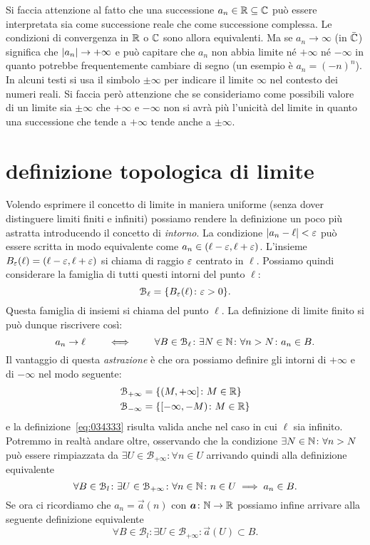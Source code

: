 Si faccia attenzione al fatto che una successione $a_n\in \mathbb R \subseteq \mathbb C$
può essere interpretata sia come successione reale che come successione complessa.
Le condizioni di convergenza in $\mathbb R$ o $\mathbb C$ sono allora equivalenti. Ma
se $a_n \to \infty$ (in $\bar {\mathbb C}$) significa che ${\left|a_n\right|}\to +\infty$
e può capitare che $a_n$ non abbia limite né $+\infty$
né $-\infty$ in quanto potrebbe frequentemente cambiare di segno
(un esempio è $a_n = (-n)^n$).
In alcuni testi si usa il simbolo $\pm \infty$ per indicare
il limite $\infty$ nel contesto dei numeri reali. Si faccia però
attenzione che se consideriamo come possibili valore di un limite
sia $\pm\infty$ che $+\infty$ e $-\infty$ non si avrà più l'unicità
del limite in quanto una successione che tende a $+\infty$
tende anche a $\pm \infty$.

\section{definizione topologica di limite}

Volendo esprimere il concetto di limite in maniera uniforme
(senza dover distinguere limiti finiti e infiniti) possiamo
rendere la definizione un poco più astratta introducendo il concetto
di \emph{intorno}.
La condizione ${\left|a_n - \ell\right|}< \varepsilon$ può essere scritta in
modo equivalente come
$a_n \in (\ell-\varepsilon, \ell+\varepsilon)$. L'insieme $B_\varepsilon(\ell) = (\ell-\varepsilon, \ell+\varepsilon)$
si chiama  di raggio $\varepsilon$ centrato in $\ell$.
Possiamo quindi considerare la famiglia
di tutti questi intorni del punto $\ell$:
\[
 \mathcal B_\ell = \{B_\varepsilon(\ell)\colon \varepsilon>0 \}.
\]
Questa famiglia di insiemi si chiama  del punto $\ell$.
La definizione
di limite finito si può dunque riscrivere così:
\begin{equation}\label{eq:034333}
  a_n\to \ell
  \qquad \iff \qquad
  \forall B \in \mathcal B_\ell\colon \exists N\in \mathbb N\colon \forall n>N\colon a_n\in B.
\end{equation}
Il vantaggio di questa \emph{astrazione} è che ora possiamo definire
gli intorni di $+\infty$ e di $-\infty$ nel modo seguente:
\begin{align*}
  \mathcal B_{+\infty} &= \{ (M,+\infty]\colon M\in \mathbb R\}\\
  \mathcal B_{-\infty} &= \{ [-\infty, -M)\colon M \in \mathbb R\}
\end{align*}
e la definizione~\eqref{eq:034333} risulta valida anche nel
caso in cui $\ell$ sia infinito.
Potremmo in realtà andare oltre, osservando che la condizione
$\exists N\in \mathbb N \colon \forall n>N$ può essere rimpiazzata
da $\exists U\in \mathcal B_{+\infty}\colon \forall n\in U$
arrivando quindi alla definizione equivalente \
\[
\forall B\in \mathcal B_l\colon \exists U\in \mathcal B_{+\infty}\colon
\forall n\in \mathbb N \colon n\in U \implies a_n\in B.
\]
Se ora ci ricordiamo che $a_n = \vec a(n)$ con $\boldsymbol a\colon \mathbb N \to \mathbb R$
possiamo infine arrivare alla seguente definizione equivalente
\[
\forall B\in \mathcal B_l\colon \exists U\in \mathcal B_{+\infty}\colon
\vec a(U)\subset B.
\]

